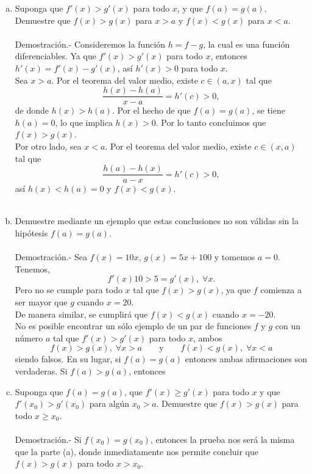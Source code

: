 \begin{enumerate}[\bfseries 1.]
\begin{enumerate}[(a)]
	    \item Suponga que $f'(x)>g'(x)$ para todo $x$, y que $f(a)=g(a)$. Demuestre que $f(x)>g(x)$ para $x>a$ y $f(x)<g(x)$ para $x<a$.\\\\
		Demostración.-\; Consideremos la función $h=f-g$, la cual es una función diferenciables. Ya que $f'(x)>g'(x)$ para todo $x$, entonces $h'(x)=f'(x)-g'(x)$, así  $h'(x)>0$ para todo $x$.\\
		Sea $x>a$. Por el teorema del valor medio, existe $c\in(a,x)$ tal que
		$$\dfrac{h(x)-h(a)}{x-a}=h'(c)>0,$$
		de donde $h(x)>h(a)$. Por el hecho de que $f(a)=g(a)$, se tiene $h(a)=0$, lo que implica $h(x)>0$. Por lo tanto concluimos que $f(x)>g(x)$.\\
		Por otro lado, sea $x<a$. Por el teorema del valor medio, existe $c\in(x,a)$ tal que
		$$\dfrac{h(a)-h(x)}{a-x}=h'(c)>0,$$
		así $h(x)<h(a)=0$ y $f(x)<g(x)$.\\\\


	    \item Demuestre mediante un ejemplo que estas conclusiones no son válidas sin la hipótesis $f(a)=g(a)$.\\\\
		Demostración.-\; Sea $f(x)=10x$, $g(x)=5x+100$ y tomemos $a=0$. Tenemos,
		$$f'(x)10>5=g'(x),\; \forall x.$$
		Pero no se cumple para todo $x$ tal que $f(x)>g(x)$, ya que $f$ comienza a ser mayor que $g$ cuando $x=20$.\\
		De manera similar, se cumplirá que $f(x)<g(x)$ cuando $x=-20$.\\
		No es posible encontrar un sólo ejemplo de un par de funciones $f$ y $g$ con un número $a$ tal que $f'(x)>g'(x)$ para todo $x$, ambos
		$$f(x)>g(x),\;\forall x>a\qquad \mbox{y}\qquad f(x)<g(x),\; \forall x<a$$
		siendo falsos. En su lugar, si $f(a)=g(a)$ entonces ambas afirmaciones son verdaderas. Si $f(a)>g(a)$, entonces 

	    \item Suponga que $f(a)=g(a)$, que $f'(x)\geq g'(x)$ para todo $x$ y que $f'(x_0)>g'(x_0)$ para algún $x_0>a$. Demuestre que $f(x)>g(x)$ para todo $x\geq x_0$.\\\\
		Demostración.-\; Si $f(x_0)=g(x_0)$, entonces la prueba nos será la misma que la parte (a), donde inmediatamente nos permite concluir que $f(x)>g(x)$ para todo $x>x_0$.\\ 

	\end{enumerate}

\end{enumerate}

